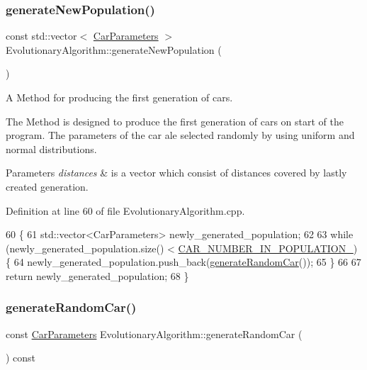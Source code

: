 \subsubsection{\texorpdfstring{generate\+New\+Population()}{generateNewPopulation()}}
{\footnotesize\ttfamily const std\+::vector$<$ \hyperlink{classCarParameters}{Car\+Parameters} $>$ Evolutionary\+Algorithm\+::generate\+New\+Population (\begin{DoxyParamCaption}{ }\end{DoxyParamCaption})}



A Method for producing the first generation of cars. 

The Method is designed to produce the first generation of cars on start of the program. The parameters of the car ale selected randomly by using uniform and normal distributions. 
\begin{DoxyParams}{Parameters}
{\em distances} & is a vector which consist of distances covered by lastly created generation. \\
\hline
\end{DoxyParams}


Definition at line 60 of file Evolutionary\+Algorithm.\+cpp.


\begin{DoxyCode}
60                                                                             \{
61     std::vector<CarParameters> newly\_generated\_population;
62 
63     \textcolor{keywordflow}{while} (newly\_generated\_population.size() < \hyperlink{classEvolutionaryAlgorithm_af466ca42d5d03e212df4575f263f3a8c}{CAR\_NUMBER\_IN\_POPULATION\_}) \{
64         newly\_generated\_population.push\_back(\hyperlink{classEvolutionaryAlgorithm_a4f36e597080d9822c36837c8a582d4d0}{generateRandomCar}());
65     \}
66 
67     \textcolor{keywordflow}{return} newly\_generated\_population;
68 \}
\end{DoxyCode}
\mbox{\label{classEvolutionaryAlgorithm_a4f36e597080d9822c36837c8a582d4d0}} 
\subsubsection{\texorpdfstring{generate\+Random\+Car()}{generateRandomCar()}}
{\footnotesize\ttfamily const \hyperlink{classCarParameters}{Car\+Parameters} Evolutionary\+Algorithm\+::generate\+Random\+Car (\begin{DoxyParamCaption}{ }\end{DoxyParamCaption}) const\hspace{0.3cm}{\ttfamily [private]}}



